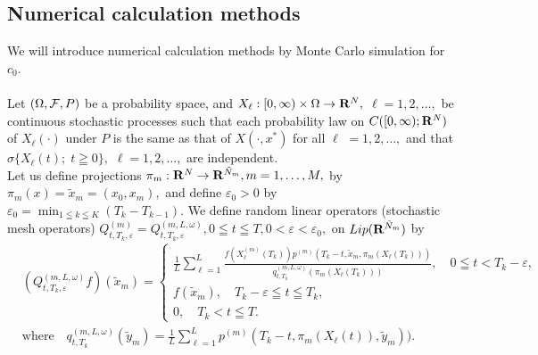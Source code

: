 \documentclass[12pt]{article}
\begin{document}
\subsection{Numerical calculation methods}
We will introduce numerical calculation methods by Monte Carlo simulation for $c_0$.\\
\\
Let $(\Omega ,{\cal F},P)$ be a probability space,
and $X_{\ell }:[0,\infty )\times \Omega \to {\bf R}^N,$ 
$\ell =1,2,\ldots ,$ be continuous stochastic processes such that 
each probability law on $C([0,\infty );{\bf R}^N)$ of
$X_{\ell}(\cdot )$ under $P$ is the same as  that of $X(\cdot ,{x}^*)$  for all $\ell$ $=1,2,\ldots ,$ and that
$\sigma \{ X_{\ell}(t); \; t\geqq 0\},$ $\ell =1,2,\ldots ,$ are independent.\\
Let us define projections $\pi_m: {\bf R}^N \to {\bf R}^{\tilde{N}_m}, m=1,\ldots,M,$ by
$ \pi_m(x)= \tilde{x}_m=(x_0,x_m),$ 
and define $\varepsilon_0 >0$ by
$\varepsilon_0 =\min_{1\leqq k \leqq K}(T_k-T_{k-1}).$
We define random linear operators (stochastic mesh operators)
 $Q_{t,T_k,\varepsilon}^{(m)}=Q_{t,T_k,\varepsilon}^{(m,L,\omega)}, 0 \leqq t \leqq T, 0 < \varepsilon <\varepsilon_0,$ 
on $Lip({\bf R}^{\tilde{N}_m})$ by
\begin{align*}
&(Q_{t,T_k,\varepsilon}^{(m,L,\omega)}f)(\tilde{x}_m)
=
\begin{cases}
\frac{1}{L} \sum_{\ell=1}^L \frac{f(X_{\ell}^{(m)}(T_k))p^{(m)}(T_k-t, \tilde{x}_m, \pi_m( X_{\ell}(T_k)))}{q_{t,T_k}^{(m,L,\omega)}(\pi_m (X_{\ell}(T_k)))}, 
\quad 0 \leqq t < T_k-\varepsilon ,\\
f(\tilde{x}_m), \quad T_k - \varepsilon \leqq t \leqq T_k, \\
0, \quad T_k < t \leqq T .
\end{cases}\\
&\text{where} \quad q_{t,T_k}^{(m,L,\omega)}(\tilde{y}_m)=\frac{1}{L}\sum_{\ell=1}^L p^{(m)}(T_k-t, \pi_m(X_{\ell}(t)), \tilde{y}_m)).
\end{align*}
\end{document}
